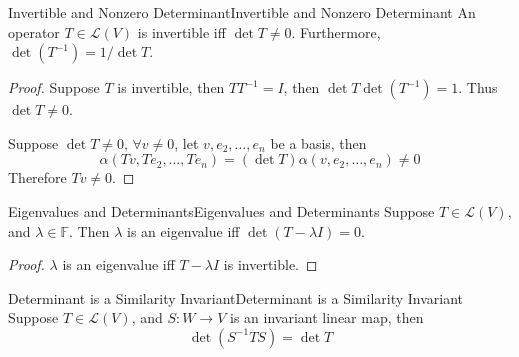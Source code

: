 \documentclass[../main.tex]{subfiles}
\begin{document}
\begin{theorem}{Invertible and Nonzero Determinant}{Invertible and Nonzero Determinant}
An operator $T\in \mathscr{L}(V)$ is invertible iff $\det T\neq 0$. Furthermore, $\det (T ^{-1}) = 1 / \det T$.
\end{theorem}
\begin{proof}
Suppose $T$ is invertible, then $T T ^{-1}=I$, then $\det T \det (T ^{-1}) = 1$. Thus $\det T\neq 0$.

Suppose $\det T\neq 0$, $\forall v\neq 0$, let $v,e_2, \ldots ,e_n$ be a basis, then
\begin{equation*}
\alpha(Tv,Te_2, \ldots ,Te_n) = (\det T) \alpha(v,e_2, \ldots ,e_n)\neq 0
\end{equation*}
Therefore $Tv\neq 0$.
\end{proof}

\begin{theorem}{Eigenvalues and Determinants}{Eigenvalues and Determinants}
Suppose $T\in \mathscr{L}(V)$, and $\lambda\in \mathbb{F}$. Then $\lambda$ is an eigenvalue iff $\det(T- \lambda I)=0$.
\end{theorem}
\begin{proof}
$\lambda$ is an eigenvalue iff $T- \lambda I$ is invertible.
\end{proof}


\begin{theorem}{Determinant is a Similarity Invariant}{Determinant is a Similarity Invariant}
Suppose $T\in \mathscr{L}(V)$, and $S: W \rightarrow V$ is an invariant linear map, then
\begin{equation*}
\det (S ^{-1}TS) = \det T
\end{equation*}
\end{theorem}
\end{document}
